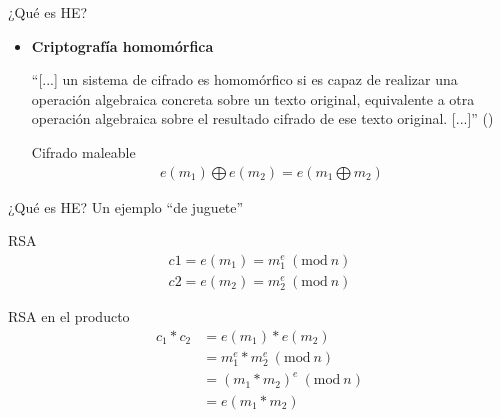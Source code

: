 \documentclass{beamer}
\newcommand{\Mod}[1]{\ (\mathrm{mod}\ #1)}
\begin{document}
\begin{frame}{¿Qué es HE?}
    \begin{itemize}
        \item \textbf{Criptografía homomórfica} 
        
        ``[...] un sistema de cifrado es homomórfico si es capaz de realizar una operación algebraica concreta sobre un texto original, equivalente a otra operación algebraica sobre el resultado cifrado de ese texto original. [...]'' (\cite{wikipedia_contributors._homomorphic_2019})
        
        \begin{block}{Cifrado maleable}
            \vspace*{-\baselineskip}\setlength\belowdisplayshortskip{0pt}
            \begin{align*}
            e(m_1) \bigoplus e(m_2) = e(m_1 \bigoplus m_2) 
            \end{align*}
        \end{block}
        
    \end{itemize}        
\end{frame}

\begin{frame}{¿Qué es HE?}
    Un ejemplo ``de juguete''
    \begin{exampleblock}{RSA}
        \vspace*{-\baselineskip}\setlength\belowdisplayshortskip{0pt}
        \begin{align*}
        c1 = e(m_1) = m_1^e \Mod{n} \\ 
        c2 = e(m_2) = m_2^e \Mod{n}
        \end{align*}
    \end{exampleblock}
    \begin{exampleblock}{RSA en el producto}
        \vspace*{-\baselineskip}\setlength\belowdisplayshortskip{0pt}
        \begin{align*}
        c_1 * c_2 &=  e(m_1) * e(m_2) \\ 
        &= m_1^e * m_2^e \Mod{n} \\
        &= (m_1 * m_2)^e \Mod{n}  \\
        &= e(m_1*m_2) 
        \end{align*}
    \end{exampleblock}
\end{frame}
\end{document}

